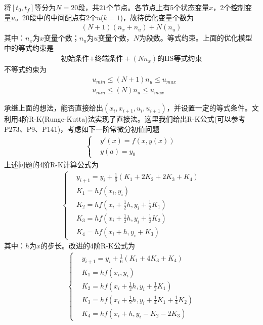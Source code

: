             将$[t_0,t_f]$等分为$N = 20$段，共$21$个节点。各节点上有5个状态变量$x$，2个控制变量$u$。20段中的中间配点有2个$u$($k=1$)，故待优化变量个数为
            \begin{align*}
            (N+1)(n_x+n_u)+N(n_u)
            \end{align*}
            其中：$n_x$为$x$变量个数；$n_u$为$u$变量个数，$N$为段数。等式约束。上面的优化模型中的等式约束是
            \begin{align*}
            \text{初始条件+终端条件}+(Nn_x)\text{的HS等式约束}
            \end{align*}
            不等式约束为
            \begin{align*}
            & u_{min} \leqslant (N+1)n_u \leqslant u_{max}\\
            & u_{min} \leqslant (N)n_u \leqslant u_{max}
            \end{align*}
            \par
            承继上面的想法，能否直接给出$(x_i,x_{i+1},u_i,u_{i+1})$，并设置一定的等式条件。文\cite{Sun.2006}利用4阶R-K(Runge-Kutta)法实现了直接法。这里我们给出R-K公式(可以参考\cite{Li}P273、\cite{Hu}P9、\cite{Chen}P141)，考虑如下一阶常微分初值问题
            \begin{align*}
            \left\{
            \begin{aligned}
            & y'(x) = f(x,y(x))\\
            & y(a) = y_0
            \end{aligned}
            \right.
            \end{align*}
            上述问题的4阶R-K计算公式为
            \begin{align*}
            \left\{
            \begin{aligned}
            & y_{i+1} = y_i + \frac{1}{6}(K_1+2K_2+2K_3+K_4)\\
            & K_1 = hf(x_i,y_i)\\
            & K_2 = hf(x_i+\frac{1}{2}h,y_i+\frac{1}{2}K_1)\\
            & K_3 = hf(x_i+\frac{1}{2}h,y_i+\frac{1}{2}K_2)\\
            & K_4 = hf(x_i+h,y_i+K_3)
            \end{aligned}
            \right.
            \end{align*}
            其中：$h$为$x$的步长。改进的4阶R-K公式为
            \begin{align*}
            \left\{
            \begin{aligned}
            & y_{i+1} = y_i + \frac{1}{6}(K_1+4K_3+K_4)\\
            & K_1 = hf(x_i,y_i)\\
            & K_2 = hf(x_i+\frac{1}{2}h,y_i+\frac{1}{2}K_1)\\
            & K_3 = hf(x_i+\frac{1}{2}h,y_i+\frac{1}{4}K_1+\frac{1}{4}K_2)\\
            & K_4 = hf(x_i+h,y_i-K_2-2K_3)
            \end{aligned}
            \right.
            \end{align*}
